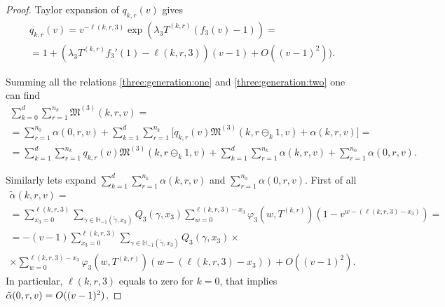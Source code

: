 \documentclass[runningheads,a4paper]{llncs}
\newcommand*{\hm}[1]{#1\nobreak\discretionary{}%
	{\hbox{$\mathsurround=0pt #1$}}{}}%
\begin{document}
\begin{proof}
Taylor expansion of $q_{k,r}(v)$ gives 
\begin{multline*}
    q_{k,r}(v) =  v^{-\ell(k,r,3)} \exp{(\lambda_3 T^{(k,r)} (f_3(v)-1))}= \\=1 + (\lambda_3 T^{(k,r)} f_3'(1) - \ell(k,r,3))(v-1) + O((v-1)^2)).
\end{multline*}

Summing all the relations \eqref{three:generation:one} and \eqref{three:generation:two} one can find
\begin{multline}
 \sum_{k=0}^{d} \sum_{r=1}^{n_k} \mathfrak{M}^{(3)}(k,r,v) =\\
 =\sum_{r=1}^{n_0} \alpha (0,r,v) + \sum_{k=1}^{d}\sum_{r=1}^{n_k} \bigl[ q_{k,r}(v) \mathfrak{M}^{(3)}(k,r\ominus_k 1,v) + \alpha(k,r,v)\bigr] = \\
 = \sum_{k=1}^{d}\sum_{r=1}^{n_k} q_{k,r}(v) \mathfrak{M}^{(3)}(k,r\ominus_k 1,v)   + \sum_{k=1}^{d}\sum_{r=1}^{n_k} \alpha(k,r,v)  + \sum_{r=1}^{n_0} \alpha (0,r,v).
 \label{summed:neccessary}
\end{multline}

Similarly lets expand $\sum_{k=1}^{d}\sum_{r=1}^{n_k} \alpha(k,r,v)$ and $\sum_{r=1}^{n_0} \alpha (0,r,v)$. First of all
\begin{multline*}
    \tilde{\alpha} (k,r,v) =\\
    = \sum_{x_3=0}^{\ell(k,r,3)}\sum_{\gamma \in {\mathbb H}_{-1}(\tilde{\gamma},x_3)} Q_3(\gamma,x_3) \sum_{w=0}^{\ell(k,r,3) - x_3} \varphi_3(w,T^{(k,r)}) (1-v^{w-(\ell(k,r,3)-x_3)})=\\= - (v-1) \sum_{x_3=0}^{\ell(k,r,3)}\sum_{\gamma \in {\mathbb H}_{-1}(\tilde{\gamma},x_3)} Q_3(\gamma,x_3) \times \\
    \times \sum_{w=0}^{\ell(k,r,3) - x_3} \varphi_3(w,T^{(k,r)}) (w-(\ell(k,r,3)-x_3)) + O((v-1)^2).
\end{multline*}
In particular, $\ell(k,r,3)$ equals to zero for $k=0$, that implies $\tilde{\alpha} (0,r,v) \hm= O((v\hm-1)^2)$.


\end{proof}
\end{document}
